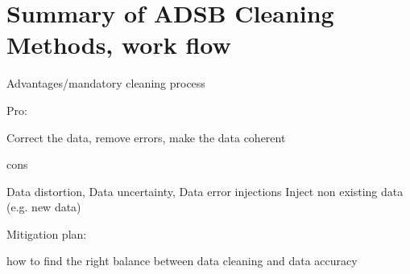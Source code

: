 \section{Summary of ADSB Cleaning Methods, work flow}

Advantages/mandatory cleaning process

Pro:

Correct the data, remove errors, make the data coherent

 cons

Data distortion,
Data uncertainty,
Data error injections
Inject non existing data (e.g. new data)


Mitigation plan:

how to find the right balance between data cleaning and data accuracy


